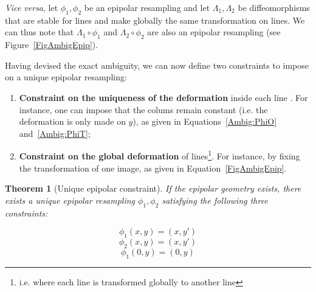 \documentclass{ipol}
\newtheorem{theorem}{Theorem}
\begin{document}
\emph{Vice versa}, let  $\phi_1,\phi_2$ be an epipolar resampling and let $\Lambda_1,\Lambda_2$ 
be diffeomorphisms  that are stable for lines and make globally the same transformation on lines. We can thus note that $\Lambda_1 \circ \phi_1$ and  $\Lambda_2 \circ \phi_2$ are also an epipolar resampling (see Figure~\ref{FigAmbigEpip}).


Having devised the exact ambiguity, we can now define two constraints to impose on a unique epipolar resampling: 
\begin{enumerate}
\item \textbf{Constraint on the uniqueness of the deformation}
inside each line . For instance, one can impose that the colums remain constant (i.e.
the deformation is only made  on  $y$), as given in Equations~\eqref{Ambig:PhiO}
and~\eqref{Ambig:PhiT};
\item \textbf{Constraint on the global deformation} of lines\footnote{i.e. where each line
is transformed globally to another line}. For instance, by fixing the transformation of one image, as given in Equation~\eqref{FigAmbigEpip}.
\end{enumerate}
 

\begin{theorem}[Unique epipolar constraint]

If the epipolar geometry exists, there exists a unique epipolar resampling $\phi_1,\phi_2$ satisfying the  following three constraints:

\begin{equation}
    \phi_1(x,y) = (x,y') \label{Ambig:PhiO}
\end{equation}
\begin{equation}
    \phi_2(x,y) = (x,y') \label{Ambig:PhiT}
\end{equation}
\begin{equation}
    \phi_1(0,y) = (0,y) \label{Ambig:Line}
\end{equation}
\label{Theo:Fix:Ambig}

\end{theorem}
\end{document}
